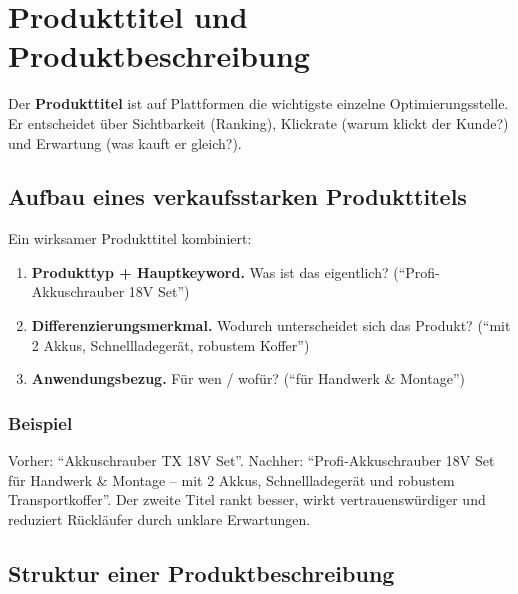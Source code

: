 \documentclass[11pt,a4paper,oneside]{article}
\newcommand{\fachbegriff}[1]{\textbf{#1}}
\begin{document}
\section{Produkttitel und Produktbeschreibung}

Der \fachbegriff{Produkttitel} ist auf Plattformen die wichtigste einzelne Optimierungsstelle. Er entscheidet über Sichtbarkeit (Ranking), Klickrate (warum klickt der Kunde?) und Erwartung (was kauft er gleich?).

\subsection{Aufbau eines verkaufsstarken Produkttitels}

Ein wirksamer Produkttitel kombiniert:

\begin{enumerate}
  \item \textbf{Produkttyp + Hauptkeyword.} Was ist das eigentlich? (``Profi-Akkuschrauber 18V Set'')
  \item \textbf{Differenzierungsmerkmal.} Wodurch unterscheidet sich das Produkt? (``mit 2 Akkus, Schnellladegerät, robustem Koffer'')
  \item \textbf{Anwendungsbezug.} Für wen / wofür? (``für Handwerk \& Montage'')
\end{enumerate}

\subsubsection{Beispiel}

Vorher: ``Akkuschrauber TX 18V Set''. Nachher: ``Profi-Akkuschrauber 18V Set für Handwerk \& Montage -- mit 2 Akkus, Schnellladegerät und robustem Transportkoffer''. Der zweite Titel rankt besser, wirkt vertrauenswürdiger und reduziert Rückläufer durch unklare Erwartungen.

\subsection{Struktur einer Produktbeschreibung}
\end{document}
